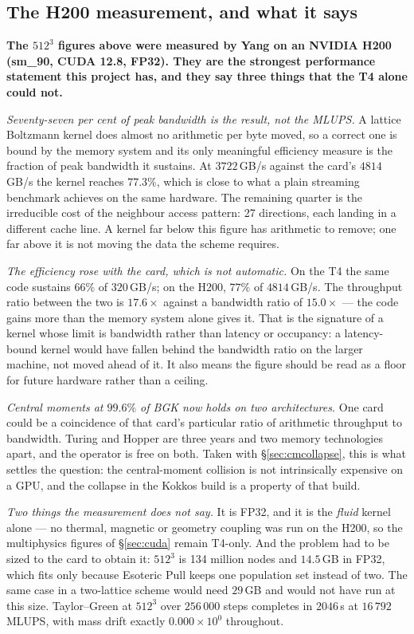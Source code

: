 \documentclass[11pt,a4paper]{article}
\newcommand{\e}[1]{\times 10^{#1}}
\begin{document}
\subsection{\texorpdfstring{\color{h200red}}{}The H200 measurement, and what it says}
\label{sec:h200}

{\color{h200red}\bfseries\boldmath
The $512^3$ figures above were measured by Yang on an NVIDIA H200
(sm\_90, CUDA 12.8, FP32). They are the strongest performance statement this
project has, and they say three things that the T4 alone could not.

\medskip
\emph{Seventy-seven per cent of peak bandwidth is the result, not the MLUPS.}
A lattice Boltzmann kernel does almost no arithmetic per byte moved, so a correct
one is bound by the memory system and its only meaningful efficiency measure is
the fraction of peak bandwidth it sustains. At $3722$\,GB/s against the card's
$4814$\,GB/s the kernel reaches $77.3\%$, which is close to what a plain
streaming benchmark achieves on the same hardware. The remaining quarter is the
irreducible cost of the neighbour access pattern: 27 directions, each landing in
a different cache line. A kernel far below this figure has arithmetic to remove;
one far above it is not moving the data the scheme requires.

\medskip
\emph{The efficiency rose with the card, which is not automatic.} On the T4 the
same code sustains $66\%$ of $320$\,GB/s; on the H200, $77\%$ of $4814$\,GB/s.
The throughput ratio between the two is $17.6\times$ against a bandwidth ratio of
$15.0\times$ --- the code gains more than the memory system alone gives it. That
is the signature of a kernel whose limit is bandwidth rather than latency or
occupancy: a latency-bound kernel would have fallen behind the bandwidth ratio on
the larger machine, not moved ahead of it. It also means the figure should be
read as a floor for future hardware rather than a ceiling.

\medskip
\emph{Central moments at $99.6\%$ of BGK now holds on two architectures.} One
card could be a coincidence of that card's particular ratio of arithmetic
throughput to bandwidth. Turing and Hopper are three years and two memory
technologies apart, and the operator is free on both. Taken with
\S\ref{sec:cmcollapse}, this is what settles the question: the central-moment
collision is not intrinsically expensive on a GPU, and the collapse in the Kokkos
build is a property of that build.

\medskip
\emph{Two things the measurement does not say.} It is FP32, and it is the
\emph{fluid} kernel alone --- no thermal, magnetic or geometry coupling was run
on the H200, so the multiphysics figures of \S\ref{sec:cuda} remain T4-only.
And the problem had to be sized to the card to obtain it: $512^3$ is 134 million
nodes and $14.5$\,GB in FP32, which fits only because Esoteric Pull keeps one
population set instead of two. The same case in a two-lattice scheme would need
$29$\,GB and would not have run at this size. Taylor--Green at $512^3$ over
$256\,000$ steps completes in $2046$\,s at $16\,792$ MLUPS, with mass drift
exactly $0.000\e{0}$ throughout.
}
\end{document}
